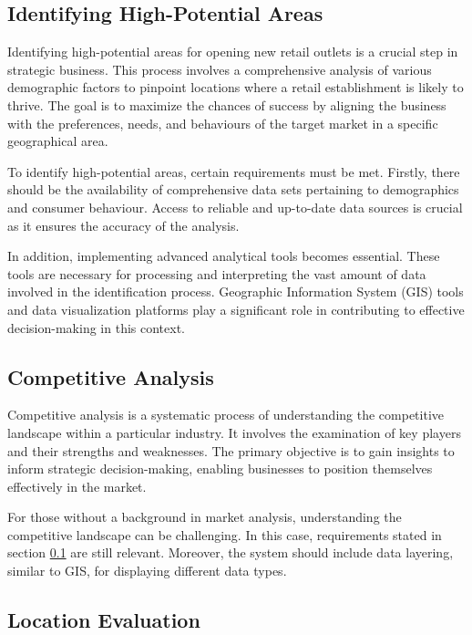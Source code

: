 \subsection{Identifying High-Potential Areas}
\label{analysis:high-potential-areas}

Identifying high-potential areas for opening new retail outlets is a crucial step in strategic business. This process involves a comprehensive analysis of various demographic factors to pinpoint locations where a retail establishment is likely to thrive. The goal is to maximize the chances of success by aligning the business with the preferences, needs, and behaviours of the target market in a specific geographical area. 

To identify high-potential areas, certain requirements must be met. Firstly, there should be the availability of comprehensive data sets pertaining to demographics and consumer behaviour. Access to reliable and up-to-date data sources is crucial as it ensures the accuracy of the analysis.

In addition, implementing advanced analytical tools becomes essential. These tools are necessary for processing and interpreting the vast amount of data involved in the identification process. Geographic Information System (GIS) tools and data visualization platforms play a significant role in contributing to effective decision-making in this context.

\subsection{Competitive Analysis}

Competitive analysis is a systematic process of understanding the competitive landscape within a particular industry. It involves the examination of key players and their strengths and weaknesses. The primary objective is to gain insights to inform strategic decision-making, enabling businesses to position themselves effectively in the market.

For those without a background in market analysis, understanding the competitive landscape can be challenging. In this case, requirements stated in section \ref{analysis:high-potential-areas} are still relevant. Moreover, the system should include data layering, similar to GIS, for displaying different data types.

\subsection{Location Evaluation}

